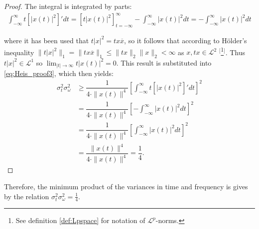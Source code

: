 \begin{proof}
The integral is integrated by parts:
\begin{align*}
\int_{-\infty}^\infty t \left[ |x(t)|^2 \right]' dt = \left[ t |x(t)|^2 \right]_{t=-\infty}^\infty - \int_{-\infty}^\infty |x(t)|^2 dt = - \int_{-\infty}^\infty |x(t)|^2 dt
\end{align*}

where it has been used that $t|x|^2 = tx\overline{x}$, so it follows that according to Hölder's inequality $\|t|x|^2\|_1 = \|tx\overline{x}\|_1 \leq \|tx\|_2 \|x\|_2 < \infty$ as $x,tx \in \mathcal{L}^2$ $^[$\footnote{See definition \ref{def:Lpspace} for notation of $\mathcal{L}^p$-norms.}$^]$. Thus $t|x|^2 \in \mathcal{L}^1$ so $\lim_{|t| \to \infty} t |x(t)|^2 = 0$. This result is substituted into \eqref{eq:Heis_proof3}, which then yields:
\begin{align*}
\sigma_t^2 \sigma_\omega^2 &\geq \dfrac{1}{4 \cdot \|x(t)\|^4} \left[ \int_{-\infty}^\infty t \left[ |x(t)|^2 \right]' dt \right]^2 \\
&= \dfrac{1}{4 \cdot \|x(t)\|^4} \left[ - \int_{-\infty}^\infty |x(t)|^2 dt \right]^2 \\
&= \dfrac{1}{4 \cdot \|x(t)\|^4} \left[ \int_{-\infty}^\infty |x(t)|^2 dt \right]^2 \\
&= \dfrac{\|x(t)\|^4}{4 \cdot \|x(t)\|^4} = \dfrac{1}{4}.
\end{align*}
\end{proof}

Therefore, the minimum product of the variances in time and frequency is gives by the relation $\sigma_t^2\sigma_\omega^2 = \frac{1}{4}$.